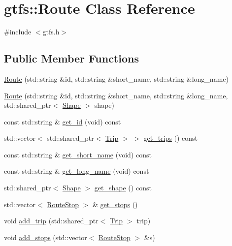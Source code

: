 \hypertarget{classgtfs_1_1Route}{}\section{gtfs\+:\+:Route Class Reference}
\label{classgtfs_1_1Route}


{\ttfamily \#include $<$gtfs.\+h$>$}

\subsection*{Public Member Functions}
\begin{DoxyCompactItemize}
\item 
\hyperlink{classgtfs_1_1Route_a32550fdfee780a26c596172184b86148}{Route} (std\+::string \&id, std\+::string \&short\+\_\+name, std\+::string \&long\+\_\+name)
\item 
\hyperlink{classgtfs_1_1Route_aa216efacee7f9eeab810e044894d3ec0}{Route} (std\+::string \&id, std\+::string \&short\+\_\+name, std\+::string \&long\+\_\+name, std\+::shared\+\_\+ptr$<$ \hyperlink{classgtfs_1_1Shape}{Shape} $>$ shape)
\item 
const std\+::string \& \hyperlink{classgtfs_1_1Route_a2d1ee4193b52ab7b8c7eb3160850cf71}{get\+\_\+id} (void) const
\item 
std\+::vector$<$ std\+::shared\+\_\+ptr$<$ \hyperlink{classgtfs_1_1Trip}{Trip} $>$ $>$ \hyperlink{classgtfs_1_1Route_a763ea7a09f20972019198515da6a1c05}{get\+\_\+trips} () const
\item 
const std\+::string \& \hyperlink{classgtfs_1_1Route_a2a0fcdf687d5e326b20c5043c9db874f}{get\+\_\+short\+\_\+name} (void) const
\item 
const std\+::string \& \hyperlink{classgtfs_1_1Route_aa943d312f934a91c3a56aec19d51cc90}{get\+\_\+long\+\_\+name} (void) const
\item 
std\+::shared\+\_\+ptr$<$ \hyperlink{classgtfs_1_1Shape}{Shape} $>$ \hyperlink{classgtfs_1_1Route_a4d3d7b29be342ae806041801327762a8}{get\+\_\+shape} () const
\item 
std\+::vector$<$ \hyperlink{structgtfs_1_1RouteStop}{Route\+Stop} $>$ \& \hyperlink{classgtfs_1_1Route_aa34e7c477efcde44cc03138cb9a0b8c8}{get\+\_\+stops} ()
\item 
void \hyperlink{classgtfs_1_1Route_aa8a666e5a8f197835764874c983e6601}{add\+\_\+trip} (std\+::shared\+\_\+ptr$<$ \hyperlink{classgtfs_1_1Trip}{Trip} $>$ trip)
\item 
void \hyperlink{classgtfs_1_1Route_a8beb0325039a69e1d34e9dcc431e047e}{add\+\_\+stops} (std\+::vector$<$ \hyperlink{structgtfs_1_1RouteStop}{Route\+Stop} $>$ \&s)
\end{DoxyCompactItemize}


